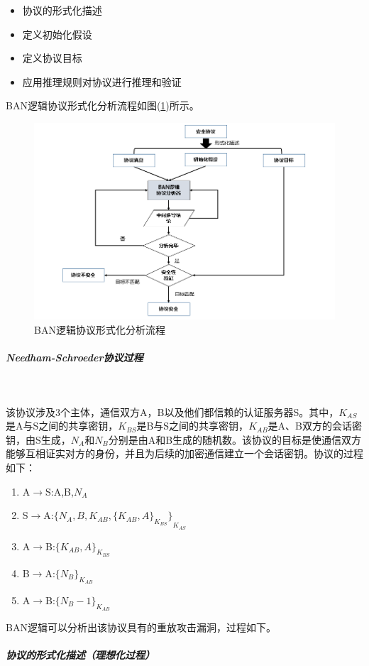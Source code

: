 \documentclass[cs4size,a4pape,UTF8]{ctexart}
\numberwithin{equation}{section}
\numberwithin{table}{section}
\numberwithin{figure}{section}
\begin{document}
\begin{itemize}
\item 协议的形式化描述
\item 定义初始化假设
\item 定义协议目标
\item 应用推理规则对协议进行推理和验证
\end{itemize}

BAN逻辑协议形式化分析流程如图(\ref{fig:3})所示。

\begin{figure}[h!]
\centering
\includegraphics[width=0.8\linewidth]{figure/3}
\caption{BAN逻辑协议形式化分析流程}
\label{fig:3}
\end{figure}

\subparagraph{Needham-Schroeder协议过程}\

该协议涉及3个主体，通信双方A，B以及他们都信赖的认证服务器S。其中，$K_{AS}$是A与S之间的共享密钥，$K_{BS}$是B与S之间的共享密钥，$K_{AB}$是A、B双方的会话密钥，由S生成，$N_{A}$和$N_{B}$分别是由A和B生成的随机数。该协议的目标是使通信双方能够互相证实对方的身份，并且为后续的加密通信建立一个会话密钥。协议的过程如下：

\begin{enumerate}[(1)]
\item A$\to$S:A,B,$N_{A}$
\item S$\to$A:${\{N_{A},B,K_{AB},{\{K_{AB},A\}}_{K_{BS}}\}}_{K_{AS}}$
\item A$\to$B:${\{K_{AB},A\}}_{K_{BS}}$
\item B$\to$A:${\{N_{B}\}}_{K_{AB}}$
\item A$\to$B:${\{N_{B}-1\}}_{K_{AB}}$
\end{enumerate}

BAN逻辑可以分析出该协议具有的重放攻击漏洞，过程如下。

\subparagraph{协议的形式化描述（理想化过程）}\
\end{document}
